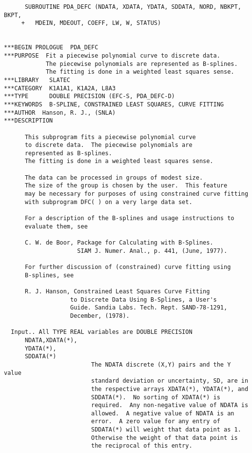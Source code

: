
\begin{verbatim}
      SUBROUTINE PDA_DEFC (NDATA, XDATA, YDATA, SDDATA, NORD, NBKPT, BKPT,
     +   MDEIN, MDEOUT, COEFF, LW, W, STATUS)


***BEGIN PROLOGUE  PDA_DEFC
***PURPOSE  Fit a piecewise polynomial curve to discrete data.
            The piecewise polynomials are represented as B-splines.
            The fitting is done in a weighted least squares sense.
***LIBRARY   SLATEC
***CATEGORY  K1A1A1, K1A2A, L8A3
***TYPE      DOUBLE PRECISION (EFC-S, PDA_DEFC-D)
***KEYWORDS  B-SPLINE, CONSTRAINED LEAST SQUARES, CURVE FITTING
***AUTHOR  Hanson, R. J., (SNLA)
***DESCRIPTION

      This subprogram fits a piecewise polynomial curve
      to discrete data.  The piecewise polynomials are
      represented as B-splines.
      The fitting is done in a weighted least squares sense.

      The data can be processed in groups of modest size.
      The size of the group is chosen by the user.  This feature
      may be necessary for purposes of using constrained curve fitting
      with subprogram DFC( ) on a very large data set.

      For a description of the B-splines and usage instructions to
      evaluate them, see

      C. W. de Boor, Package for Calculating with B-Splines.
                     SIAM J. Numer. Anal., p. 441, (June, 1977).

      For further discussion of (constrained) curve fitting using
      B-splines, see

      R. J. Hanson, Constrained Least Squares Curve Fitting
                   to Discrete Data Using B-Splines, a User's
                   Guide. Sandia Labs. Tech. Rept. SAND-78-1291,
                   December, (1978).

  Input.. All TYPE REAL variables are DOUBLE PRECISION
      NDATA,XDATA(*),
      YDATA(*),
      SDDATA(*)
                         The NDATA discrete (X,Y) pairs and the Y value
                         standard deviation or uncertainty, SD, are in
                         the respective arrays XDATA(*), YDATA(*), and
                         SDDATA(*).  No sorting of XDATA(*) is
                         required.  Any non-negative value of NDATA is
                         allowed.  A negative value of NDATA is an
                         error.  A zero value for any entry of
                         SDDATA(*) will weight that data point as 1.
                         Otherwise the weight of that data point is
                         the reciprocal of this entry.


\end{verbatim}
